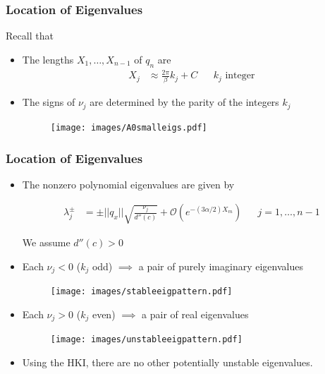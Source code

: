 \documentclass[16pt]{beamer}
\begin{document}
\begin{frame}
\frametitle{Location of Eigenvalues}
	Recall that
	\begin{itemize}

		\item The lengths $X_1, \dots, X_{n-1}$ of $q_n$ are
		\begin{align*}
		X_j &\approx \frac{2\pi}{\beta} k_j + C && k_j \text{ integer}
	    \end{align*}

    	\item The signs of $\nu_j$ are determined by the parity of the integers $k_j$ 
        \begin{figure}
		\begin{center}
		\texttt{[image: images/A0smalleigs.pdf]}
		\end{center}
		\end{figure}
	\end{itemize}
\end{frame}

\begin{frame}
\frametitle{Location of Eigenvalues}
	\begin{itemize}
		\item The nonzero polynomial eigenvalues are given by

		\begin{align*}
      		\lambda_j^\pm &= \pm ||q_x|| \sqrt{ \frac{\nu_j}{d''(c)} } + \mathcal{O}(e^{-(3 \alpha/2) X_m})
      		&&j = 1, \dots, n-1
      	\end{align*}

      	We assume $d''(c) > 0$

        \item Each $\nu_j < 0$ ($k_j$ odd) $\implies$ a pair of purely imaginary eigenvalues
       	\begin{figure}
		\begin{center}
		\texttt{[image: images/stableeigpattern.pdf]}
		\end{center}
		\end{figure}

        \item Each $\nu_j > 0$ ($k_j$ even) $\implies$ a pair of real eigenvalues

        \begin{figure}
		\begin{center}
		\texttt{[image: images/unstableeigpattern.pdf]}
		\end{center}
		\end{figure}
		\item Using the HKI, there are no other potentially unstable eigenvalues.
	\end{itemize}
\end{frame}
\end{document}
